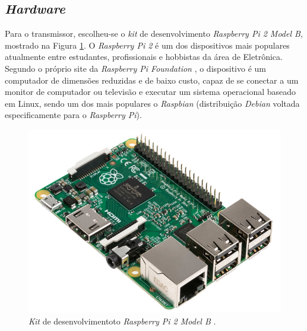 \subsection{\textit{Hardware}}
Para o transmissor, escolheu-se o \textit{kit} de desenvolvimento \textit{Raspberry Pi 2 Model B}, mostrado na Figura \ref{fig:rasp}. O \textit{Raspberry Pi 2} é um dos dispositivos mais populares atualmente entre estudantes, profissionais e hobbistas da área de Eletrônica. Segundo o próprio site da \textit{Raspberry Pi Foundation} \cite{raspberryOrg}, o dispositivo é um computador de dimensões reduzidas e de baixo custo, capaz de se conectar a um monitor de computador ou televisão e executar um sistema operacional baseado em Linux, sendo um dos mais populares o \textit{Raspbian} (distribuição \textit{Debian} voltada especificamente para o \textit{Raspberry Pi}).

\begin{figure}[h]
	\centering
	\includegraphics[scale=.5]{figuras/rpi2b.jpg}
	\caption{ \textit{Kit} de desenvolvimentoto \textit{Raspberry Pi 2 Model B} \cite{element14}.}
	\label{fig:rasp}
\end{figure}

